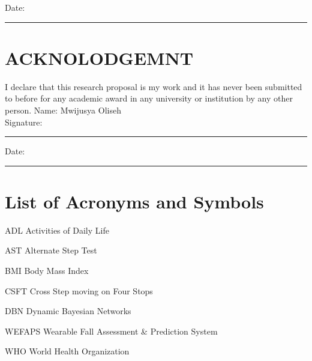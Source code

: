\documentclass[12pt, a4paper, oneside]{thesis}
\begin{document}
Date:\\
\rule[1em]{25em}{0.5pt} %

\clearpage 
\vspace{7cm}

\section*{ACKNOLODGEMNT}

I declare that this research proposal is my work and it has never been submitted to before for any academic award in any university or institution by any other person.
\vspace{1cm}
Name:   Mwijusya Oliseh\\

Signature:\\
\rule[1em]{25em}{0.5pt} %
 
Date:\\
\rule[1em]{25em}{0.5pt} %

\clearpage

\tableofcontents
{}
\listoffigures\newpage
{}
\listoftables\newpage
\clearpage



\thispagestyle{empty}
\section*{List of Acronyms and Symbols}

\begin{abbrv}
\item[ADL]                   Activities of Daily Life
\item[AST]                   Alternate Step Test
\item[BMI]                   Body Mass Index
\item[CSFT]                  Cross Step moving on Four Stops
\item[DBN]                   Dynamic Bayesian Networks
\item[WEFAPS]                Wearable Fall Assessment \& Prediction System
\item[WHO]                   World Health Organization
\end{abbrv}
\end{document}
